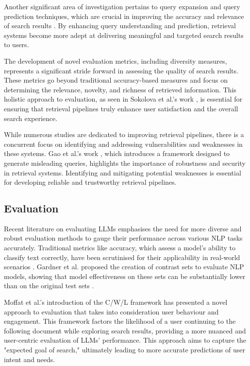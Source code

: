 Another significant area of investigation pertains to query expansion and query prediction techniques, which are crucial in improving the accuracy and relevance of search results \cite{zendel, lu, moffat}. By enhancing query understanding and prediction, retrieval systems become more adept at delivering meaningful and targeted search results to users.

The development of novel evaluation metrics, including diversity measures, represents a significant stride forward in assessing the quality of search results. These metrics go beyond traditional accuracy-based measures and focus on determining the relevance, novelty, and richness of retrieved information. This holistic approach to evaluation, as seen in Sokolova et al.'s work \cite{sokolova}, is essential for ensuring that retrieval pipelines truly enhance user satisfaction and the overall search experience.

While numerous studies are dedicated to improving retrieval pipelines, there is a concurrent focus on identifying and addressing vulnerabilities and weaknesses in these systems. Gao et al.'s work \cite{gao}, which introduces a framework designed to generate misleading queries, highlights the importance of robustness and security in retrieval systems. Identifying and mitigating potential weaknesses is essential for developing reliable and trustworthy retrieval pipelines.

\subsection{Evaluation}
Recent literature on evaluating LLMs emphasises the need for more diverse and robust evaluation methods to gauge their performance across various NLP tasks accurately. Traditional metrics like accuracy, which assess a model's ability to classify text correctly, have been scrutinised for their applicability in real-world scenarios \cite{sokolova, ribeiro}. Gardner et al. proposed the creation of contrast sets to evaluate NLP models, showing that model effectiveness on these sets can be substantially lower than on the original test sets \cite{gardner}.

Moffat et al.'s introduction of the C/W/L framework \cite{moffat} has presented a novel approach to evaluation that takes into consideration user behaviour and engagement. This framework factors the likelihood of a user continuing to the following document while exploring search results, providing a more nuanced and user-centric evaluation of LLMs' performance. This approach aims to capture the "expected goal of search," ultimately leading to more accurate predictions of user intent and needs.

